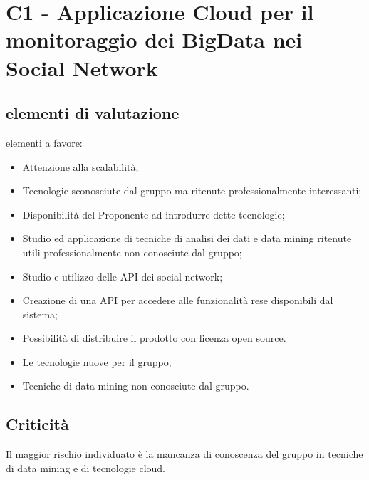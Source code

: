 \section{C1 - Applicazione Cloud per il monitoraggio dei BigData nei Social Network}{
	\subsection{elementi di valutazione}{
		elementi a favore:
		\begin{itemize}
			\item Attenzione alla scalabilità;
			\item Tecnologie sconosciute dal gruppo ma ritenute professionalmente interessanti;
			\item Disponibilità del Proponente ad introdurre dette tecnologie;
			\item Studio ed applicazione di tecniche di analisi dei dati e data mining ritenute utili professionalmente non conosciute dal gruppo;
			\item Studio e utilizzo delle API dei social network;
			\item Creazione di una API per accedere alle funzionalità rese disponibili dal sistema;
			\item Possibilità di distribuire il prodotto con licenza open source.
		\end{itemize}
		
		\begin{itemize}
			\item Le tecnologie nuove per il gruppo;
			\item Tecniche di data mining non conosciute dal gruppo.
		\end{itemize}
	}
	\subsection{Criticità}{
		Il maggior rischio individuato è la mancanza di conoscenza del gruppo in tecniche di data mining e di tecnologie cloud.
	}
}
